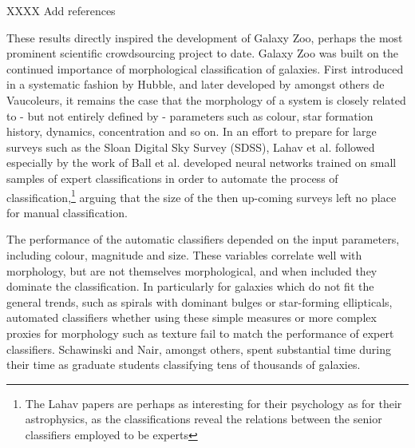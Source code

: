 \documentclass{ar2e}
\begin{document}
XXXX Add references 


These results directly inspired the development of Galaxy Zoo, perhaps the
most prominent scientific crowdsourcing project to date. Galaxy Zoo was built
on the continued importance of morphological classification of galaxies. First
introduced in a systematic fashion by Hubble, and later developed by amongst
others de Vaucoleurs, it remains the case that the morphology of a system is
closely related to - but not entirely defined by - parameters such as colour,
star formation history, dynamics, concentration and so on. In an effort to
prepare for large surveys such as the Sloan Digital Sky Survey (SDSS), Lahav
et al. followed especially by the work of Ball et al. developed neural
networks trained on small samples of expert classifications in order to
automate the process of classification,\footnote{The Lahav papers are perhaps
as interesting for their psychology as for their astrophysics, as the
classifications reveal the relations between the senior classifiers employed
to be experts} arguing that the size of the then up-coming surveys left no
place for manual classification.

The performance of the automatic classifiers depended on the input parameters,
including colour, magnitude and size. These variables correlate well with
morphology, but are not themselves morphological, and when included they
dominate the classification. In particularly for galaxies which do not fit the
general trends, such as spirals with dominant bulges or star-forming
ellipticals, automated classifiers whether using these simple measures or more
complex proxies for morphology such as texture fail to match the performance
of expert classifiers. Schawinski and Nair, amongst others, spent substantial
time during their time as graduate students classifying tens of thousands of
galaxies. 
\end{document}
